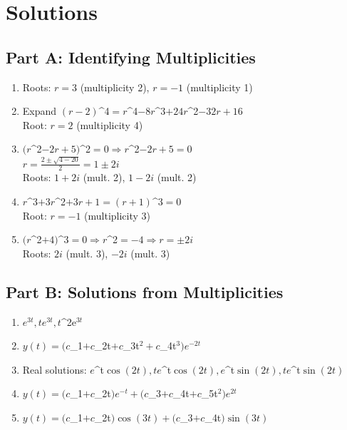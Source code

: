\documentclass[12pt]{article}
\begin{document}
\newpage

\section*{Solutions}

\subsection*{Part A: Identifying Multiplicities}

\begin{enumerate}
\item Roots: $r = 3$ (multiplicity 2), $r = -1$ (multiplicity 1)

\item Expand $(r-2)$^{4}$ = r$^{4}$ - 8r$^{3}$ + 24r$^{2}$ - 32r + 16$ \checkmark\\
Root: $r = 2$ (multiplicity 4)

\item $(r$^{2}$ - 2r + 5)$^{2}$ = 0 \Rightarrow r$^{2}$ - 2r + 5 = 0$\\
$r = \frac{2 \pm \sqrt{4-20}}{2} = 1 \pm 2i$\\
Roots: $1 + 2i$ (mult. 2), $1 - 2i$ (mult. 2)

\item $r$^{3}$ + 3r$^{2}$ + 3r + 1 = (r+1)$^{3}$ = 0$\\
Root: $r = -1$ (multiplicity 3)

\item $(r$^{2}$ + 4)$^{3}$ = 0 \Rightarrow r$^{2}$ = -4 \Rightarrow r = \pm 2i$\\
Roots: $2i$ (mult. 3), $-2i$ (mult. 3)
\end{enumerate}

\subsection*{Part B: Solutions from Multiplicities}

\begin{enumerate}[resume]
\item $e^{3t}, te^{3t}, t$^{2e}$^{3t}$

\item $y(t) = (c$_{1}$ + c$_{2t}$ + c$_{3t}$^2 + c$_{4t}$^3)e^{-2t}$

\item Real solutions: $e$^{t}$\cos(2t), te$^{t}$\cos(2t), e$^{t}$\sin(2t), te$^{t}$\sin(2t)$

\item $y(t) = (c$_{1}$ + c$_{2t}$)e^{-t} + (c$_{3}$ + c$_{4t}$ + c$_{5t}$^2)e^{2t}$

\item $y(t) = (c$_{1}$ + c$_{2t}$)\cos(3t) + (c$_{3}$ + c$_{4t}$)\sin(3t)$
\end{enumerate}
\end{document}
